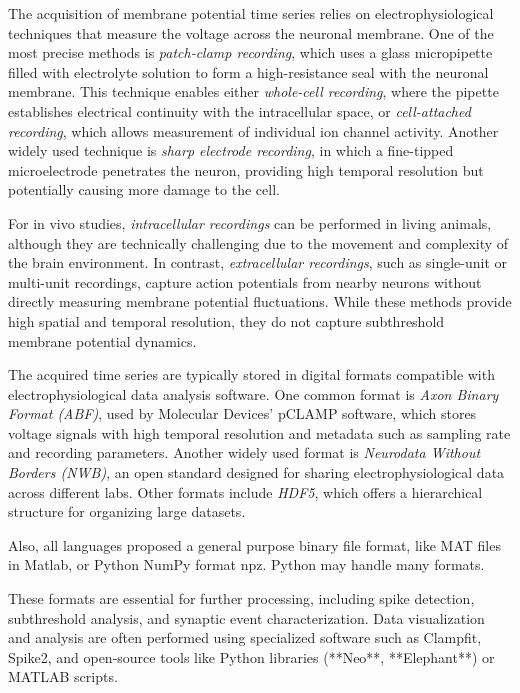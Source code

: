 \documentclass[a4paper,9pt]{extarticle}
\begin{document}
\begin{multicols}{2}
\bigskip

The acquisition of membrane potential time series relies on electrophysiological techniques that measure the voltage across the neuronal membrane. One of the most precise methods is \emph{patch-clamp recording}, which uses a glass micropipette filled with electrolyte solution to form a high-resistance seal with the neuronal membrane. This technique enables either \emph{whole-cell recording}, where the pipette establishes electrical continuity with the intracellular space, or \emph{cell-attached recording}, which allows measurement of individual ion channel activity. Another widely used technique is \emph{sharp electrode recording}, in which a fine-tipped microelectrode penetrates the neuron, providing high temporal resolution but potentially causing more damage to the cell.

For in vivo studies, \emph{intracellular recordings} can be performed in living animals, although they are technically challenging due to the movement and complexity of the brain environment. In contrast, \emph{extracellular recordings}, such as single-unit or multi-unit recordings, capture action potentials from nearby neurons without directly measuring membrane potential fluctuations. While these methods provide high spatial and temporal resolution, they do not capture subthreshold membrane potential dynamics.

The acquired time series are typically stored in digital formats compatible with electrophysiological data analysis software. One common format is \emph{Axon Binary Format (ABF)}, used by Molecular Devices' pCLAMP software, which stores voltage signals with high temporal resolution and metadata such as sampling rate and recording parameters. Another widely used format is \emph{Neurodata Without Borders (NWB)}, an open standard designed for sharing electrophysiological data across different labs. Other formats include \emph{HDF5}, which offers a hierarchical structure for organizing large datasets. 

Also, all languages proposed a general purpose binary file format, like MAT files in Matlab, or Python NumPy format npz. Python may handle many formats.


These formats are essential for further processing, including spike detection, subthreshold analysis, and synaptic event characterization. Data visualization and analysis are often performed using specialized software such as Clampfit, Spike2, and open-source tools like Python libraries (**Neo**, **Elephant**) or MATLAB scripts.

\end{multicols}
\end{document}
